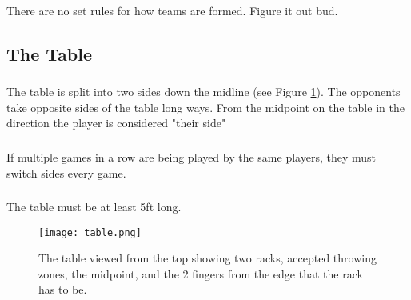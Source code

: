		\subsubsection{}\label{sssec:teams,choosing}
			There are no set rules for how teams are formed. Figure it out bud.
			
	\subsection{The Table}\label{ssec:Table}
		\subsubsection{}\label{sssec:Table,sides}
            The table is split into two sides down the midline (see Figure \ref{fig:table}).
			The opponents take opposite sides of the table long ways. 
			From the midpoint on the table in the direction the player is considered "their side"
		\subsubsection{}\label{sssec:Table,switch}
			If multiple games in a row are being played by the same players, they must switch sides every game.
		\subsubsection{}\label{sssec:Table,length}
			The table must be at least 5ft long.

    \begin{figure}
        \centering
        \texttt{[image: table.png]}
        \caption{The table viewed from the top showing two racks, accepted throwing zones, the midpoint, and the 2 fingers from the edge that the rack has to be.}
        \label{fig:table}
    \end{figure}
